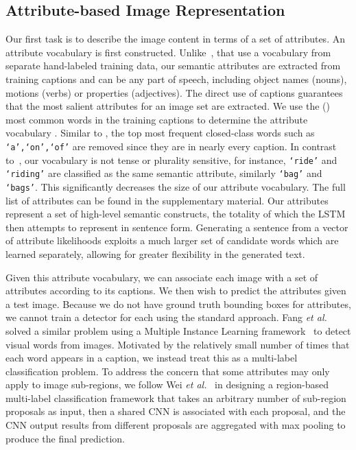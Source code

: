 \documentclass[10pt,journal,compsoc]{IEEEtran}
\newcommand{\etal}{\emph{et al.}}
\begin{document}
\subsection{Attribute-based Image Representation}
\label{subsec:Attributes_Predictor}
Our first task is to describe the image content in terms of a set of attributes. An attribute vocabulary is first constructed. Unlike~\cite{kulkarni2013babytalk,yang2011corpus}, that use a vocabulary from separate hand-labeled training data, our semantic attributes are extracted from training captions and can be any part of speech, including object names (nouns), motions (verbs) or properties (adjectives). The direct use of captions guarantees that the most salient attributes for an image set are extracted. We use the  () most common words in the training captions to determine the attribute vocabulary . Similar to \cite{fang2014captions}, the top  most frequent closed-class words such as \texttt{`a',`on',`of'}  are removed since they are in nearly every caption. In contrast to~\cite{fang2014captions}, our vocabulary is not tense or plurality sensitive, for instance, \texttt{`ride'} and \texttt{`riding'} are classified as the same semantic attribute, similarly \texttt{`bag'} and \texttt{`bags'}. This significantly decreases the size of our attribute vocabulary. The full list of attributes can be found in the supplementary material. Our attributes represent a set of high-level semantic constructs, the totality of which the LSTM then attempts to represent in sentence form. Generating a sentence from a vector of attribute likelihoods exploits a much larger set of candidate words which are learned separately, allowing for greater flexibility in the generated text.

Given this attribute vocabulary, we can associate each image with a set of attributes according to its captions. We then wish to predict the attributes given a test image. Because we do not have ground truth bounding boxes for attributes, we cannot train a detector for each using the standard approach. Fang \etal~\cite{fang2014captions} solved a similar problem using a Multiple Instance Learning framework~\cite{zhang2005multiple} to detect visual words from images. Motivated by the relatively small number of times that each word appears in a caption, we instead treat this as a multi-label classification problem. To address the concern that some attributes may only apply to image sub-regions, we follow Wei \etal~\cite{wei2014cnn} in designing a region-based multi-label classification framework that takes an arbitrary number of sub-region proposals as input, then a shared CNN is associated with each proposal, and the CNN output results from different proposals are aggregated with max pooling to produce the final prediction.
\end{document}
